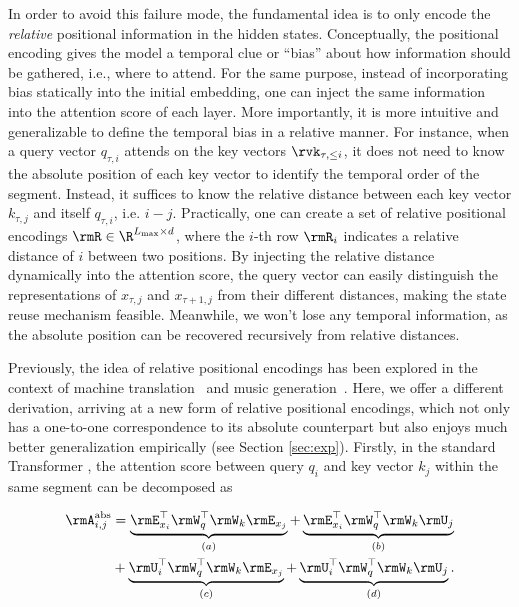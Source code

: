 In order to avoid this failure mode, the fundamental idea is to only encode the \textit{relative} positional information in the hidden states.
Conceptually, the positional encoding gives the model a temporal clue or ``bias'' about how information should be gathered, i.e., where to attend.
For the same purpose, instead of incorporating bias statically into the initial embedding, one can inject the same information into the attention score of each layer.
More importantly, it is more intuitive and generalizable to define the temporal bias in a relative manner.
For instance, when a query vector $q_{\tau,i}$ attends on the key vectors $\rvk_{\tau,\leq i}$, it does not need to know the absolute position of each key vector to identify the temporal order of the segment.
Instead, it suffices to know the relative distance between each key vector $k_{\tau,j}$ and itself $q_{\tau,i}$, i.e. $i - j$. %
Practically, one can create a set of relative positional encodings $\rmR \in \R^{L_\text{max} \times d}$, where the $i$-th row $\rmR_i$ indicates a relative distance of $i$ between two positions.
By injecting the relative distance dynamically into the attention score, the query vector can easily distinguish the representations of $x_{\tau,j}$ and $x_{\tau+1,j}$ from their different distances, making the state reuse mechanism feasible.
Meanwhile, we won't lose any temporal information, as the absolute position can be recovered recursively from relative distances.

Previously, the idea of relative positional encodings has been explored in the context of machine translation~\citep{shaw2018self} and music generation~\citep{huang2018improved}.
Here, we offer a different derivation, arriving at a new form of relative positional encodings, which not only has a one-to-one correspondence to its absolute counterpart but also enjoys much better generalization empirically (see Section \ref{sec:exp}).
Firstly, in the standard Transformer \citep{vaswani2017attention}, the attention score between query $q_i$ and key vector $k_j$ within the same segment can be decomposed as
\par\nobreak
\vspace{-0.5em}
\small
\begin{align*}
	\rmA_{i,j}^\text{abs} %
	&= \underbrace{ \rmE_{x_i}^\top \rmW_q^\top \rmW_k \rmE_{x_j} }_{(a)}
	+ \underbrace{\rmE_{x_i}^\top \rmW_q^\top \rmW_k \rmU_{j}}_{(b)} \\
	&+ \underbrace{\rmU_{i}^\top \rmW_q^\top \rmW_k \rmE_{x_j}}_{(c)}
	+ \underbrace{\rmU_{i}^\top \rmW_q^\top \rmW_k \rmU_{j}}_{(d)}. \vspace{-0.5em}
\end{align*}
\normalsize
\vspace{-1em}

